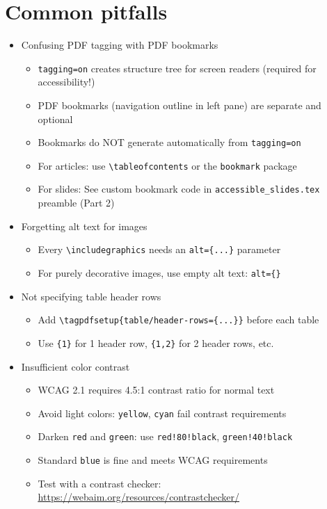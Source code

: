 \documentclass{article}
\newcommand\RedText[1]{\textcolor{AccessibleRed}{#1}}
\newcommand\GreenText[1]{\textcolor{AccessibleGreen}{#1}}
\newcommand{\urlu}[1]{\uline{\url{#1}}}        %
\begin{document}
\section{Common pitfalls}
  \begin{itemize}
  \item \RedText{Confusing PDF tagging with PDF bookmarks}
    \begin{itemize}
    \item \texttt{tagging=on} creates structure tree for \GreenText{screen readers} (required for accessibility!)
    \item PDF bookmarks (navigation outline in left pane) are \GreenText{separate and optional}
    \item Bookmarks do NOT generate automatically from \texttt{tagging=on}
    \item For articles: use \texttt{\textbackslash tableofcontents} or the \texttt{bookmark} package
    \item For slides: See custom bookmark code in \texttt{accessible\_slides.tex} preamble (Part 2)
    \end{itemize}
    
  \item \RedText{Forgetting alt text for images}
    \begin{itemize}
    \item Every \texttt{\textbackslash includegraphics} needs an \texttt{alt=\{...\}} parameter
    \item For purely decorative images, use empty alt text: \texttt{alt=\{\}}
    \end{itemize}
    
  \item \RedText{Not specifying table header rows}
    \begin{itemize}
    \item Add \texttt{\textbackslash tagpdfsetup\{table/header-rows=\{...\}\}} before each table
    \item Use \texttt{\{1\}} for 1 header row, \texttt{\{1,2\}} for 2 header rows, etc.
    \end{itemize}
    
  \item \RedText{Insufficient color contrast}
    \begin{itemize}
    \item WCAG 2.1 requires 4.5:1 contrast ratio for normal text
    \item Avoid light colors: \texttt{yellow}, \texttt{cyan} fail contrast requirements
    \item Darken \texttt{red} and \texttt{green}: use \texttt{red!80!black}, \texttt{green!40!black}
    \item Standard \texttt{blue} is fine and meets WCAG requirements
    \item Test with a contrast checker: \urlu{https://webaim.org/resources/contrastchecker/}
    \end{itemize}


\end{itemize}
\end{document}
